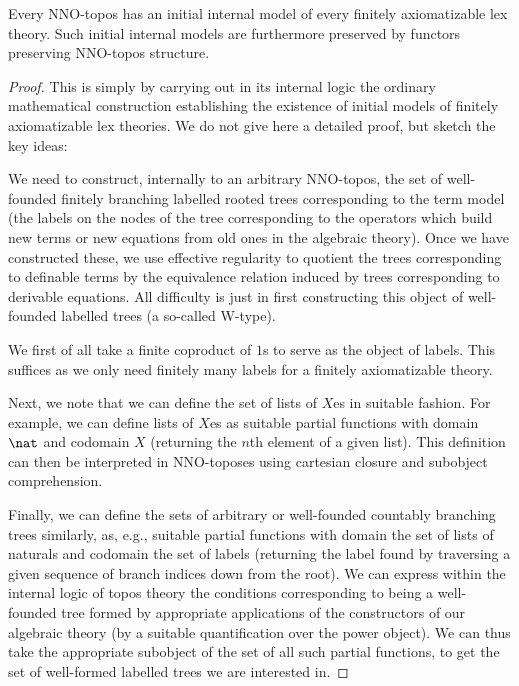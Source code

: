 \begin{theorem}\label{NNOToposIsInitoGeminal}
Every NNO-topos has an initial internal model of every finitely axiomatizable lex theory. Such initial internal models are furthermore preserved by functors preserving NNO-topos structure.
\end{theorem}
\begin{proof}
This is simply by carrying out in its internal logic the ordinary mathematical construction establishing the existence of initial models of finitely axiomatizable lex theories. We do not give here a detailed proof, but sketch the key ideas:

We need to construct, internally to an arbitrary NNO-topos, the set of well-founded finitely branching labelled rooted trees corresponding to the term model (the labels on the nodes of the tree corresponding to the operators which build new terms or new equations from old ones in the algebraic theory). Once we have constructed these, we use effective regularity to quotient the trees corresponding to definable terms by the equivalence relation induced by trees corresponding to derivable equations. All difficulty is just in first constructing this object of well-founded labelled trees (a so-called W-type).

We first of all take a finite coproduct of $1$s to serve as the object of labels. This suffices as we only need finitely many labels for a finitely axiomatizable theory.

Next, we note that we can define the set of lists of $X$es in suitable fashion. For example, we can define lists of $X$es as suitable partial functions with domain $\nat$ and codomain $X$ (returning the $n$th element of a given list). This definition can then be interpreted in NNO-toposes using cartesian closure and subobject comprehension.

Finally, we can define the sets of arbitrary or well-founded countably branching trees similarly, as, e.g., suitable partial functions with domain the set of lists of naturals and codomain the set of labels (returning the label found by traversing a given sequence of branch indices down from the root). We can express within the internal logic of topos theory the conditions corresponding to being a well-founded tree formed by appropriate applications of the constructors of our algebraic theory (by a suitable quantification over the power object). We can thus take the appropriate subobject of the set of all such partial functions, to get the set of well-formed labelled trees we are interested in.


\end{proof}
